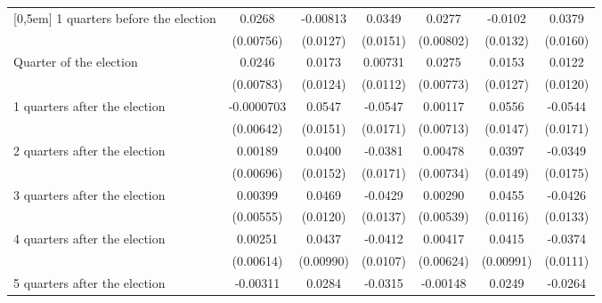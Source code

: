 \begin{table}[!ht]
\begin{tabular}{l*{6}{c}}
[0,5em]
 1 quarters before the election&      0.0268\sym{***}&    -0.00813         &      0.0349\sym{*}  &      0.0277\sym{***}&     -0.0102         &      0.0379\sym{*}  \\
                    &   (0.00756)         &    (0.0127)         &    (0.0151)         &   (0.00802)         &    (0.0132)         &    (0.0160)         \\
[0,5em]
Quarter of the election&      0.0246\sym{**} &      0.0173         &     0.00731         &      0.0275\sym{***}&      0.0153         &      0.0122         \\
                    &   (0.00783)         &    (0.0124)         &    (0.0112)         &   (0.00773)         &    (0.0127)         &    (0.0120)         \\
[0,5em]
 1 quarters after the election&  -0.0000703         &      0.0547\sym{***}&     -0.0547\sym{**} &     0.00117         &      0.0556\sym{***}&     -0.0544\sym{**} \\
                    &   (0.00642)         &    (0.0151)         &    (0.0171)         &   (0.00713)         &    (0.0147)         &    (0.0171)         \\
[0,5em]
 2 quarters after the election&     0.00189         &      0.0400\sym{**} &     -0.0381\sym{*}  &     0.00478         &      0.0397\sym{**} &     -0.0349\sym{*}  \\
                    &   (0.00696)         &    (0.0152)         &    (0.0171)         &   (0.00734)         &    (0.0149)         &    (0.0175)         \\
[0,5em]
 3 quarters after the election&     0.00399         &      0.0469\sym{***}&     -0.0429\sym{**} &     0.00290         &      0.0455\sym{***}&     -0.0426\sym{**} \\
                    &   (0.00555)         &    (0.0120)         &    (0.0137)         &   (0.00539)         &    (0.0116)         &    (0.0133)         \\
[0,5em]
 4 quarters after the election&     0.00251         &      0.0437\sym{***}&     -0.0412\sym{***}&     0.00417         &      0.0415\sym{***}&     -0.0374\sym{***}\\
                    &   (0.00614)         &   (0.00990)         &    (0.0107)         &   (0.00624)         &   (0.00991)         &    (0.0111)         \\
[0,5em]
 5 quarters after the election&    -0.00311         &      0.0284\sym{**} &     -0.0315\sym{**} &    -0.00148         &      0.0249\sym{*}  &     -0.0264\sym{*}  \\

\end{tabular}
\end{table}
